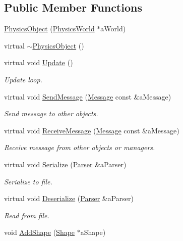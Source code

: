 \subsection*{Public Member Functions}
\begin{DoxyCompactItemize}
\item 
\hyperlink{classPhysicsObject_a79bd3aba4411227e44f2361b4cc77864}{Physics\+Object} (\hyperlink{classPhysicsWorld}{Physics\+World} $\ast$a\+World)
\item 
virtual \hyperlink{classPhysicsObject_a2172e8b71176e3a54d6a8f5ff15d4178}{$\sim$\+Physics\+Object} ()
\item 
virtual void \hyperlink{classPhysicsObject_a8da7c2b9a0d491633dc8057b6d95de11}{Update} ()
\begin{DoxyCompactList}\small\item\em Update loop. \end{DoxyCompactList}\item 
virtual void \hyperlink{classPhysicsObject_a922c9aca3c8a8bada45a69a09d4231e9}{Send\+Message} (\hyperlink{classMessage}{Message} const \&a\+Message)
\begin{DoxyCompactList}\small\item\em Send message to other objects. \end{DoxyCompactList}\item 
virtual void \hyperlink{classPhysicsObject_ac3b6b5e359c343a36da1564bfe4a9337}{Receive\+Message} (\hyperlink{classMessage}{Message} const \&a\+Message)
\begin{DoxyCompactList}\small\item\em Receive message from other objects or managers. \end{DoxyCompactList}\item 
virtual void \hyperlink{classPhysicsObject_a145770d38d3469a5bf77e2c0318fc1fb}{Serialize} (\hyperlink{classParser}{Parser} \&a\+Parser)
\begin{DoxyCompactList}\small\item\em Serialize to file. \end{DoxyCompactList}\item 
virtual void \hyperlink{classPhysicsObject_a131cc28cad0335509d0372543ebcd513}{Deserialize} (\hyperlink{classParser}{Parser} \&a\+Parser)
\begin{DoxyCompactList}\small\item\em Read from file. \end{DoxyCompactList}\item 
void \hyperlink{classPhysicsObject_a6977665c22a33f7384d6640c1658be4d}{Add\+Shape} (\hyperlink{structShape}{Shape} $\ast$a\+Shape)

\end{DoxyCompactItemize}
